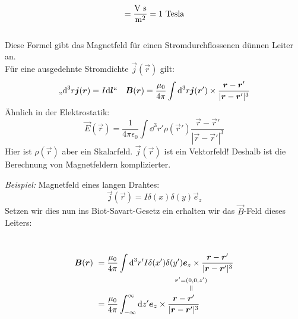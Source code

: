 \begin{equation*}
[\vec{B}] = \frac{\tx{V s}}{\tx{m}^2} = 1 \tx{ Tesla}
\end{equation*}\\[5pt]
\noindent
Diese Formel gibt das Magnetfeld für einen Stromdurchflossenen dünnen Leiter an.\\[5pt]
Für eine ausgedehnte Stromdichte $ \vec{j}(\vec{r}) $ gilt:
\begin{equation*}
\textrm{,,} \textrm{d}^3 r \bm{j}(\bm{r}) = I \textrm{d} \bm{l}`` \quad \bm{B}(\bm{r}) = \frac{\mu_0}{4 \pi} \int \textrm{d}^3 r \bm{j}(\bm{r}') \times \frac{\bm{r}- \bm{r}'}{|\bm{r} - \bm{r}'|^3}
\end{equation*}
Ähnlich in der Elektrostatik:
\begin{equation*}
\vec{E}(\vec{r}) = \frac{1}{4 \pi \epsilon_0} \int \dd^3 r' \rho(\vec{r}') \frac{\vec{r} - \vec{r}'}{|\vec{r} - \vec{r}'|^3}
\end{equation*}
Hier ist $ \rho(\vec{r}) $ aber ein Skalarfeld. $ \vec{j}(\vec{r}) $ ist ein Vektorfeld! Deshalb ist die Berechnung von Magnetfeldern komplizierter.\\[5pt]
\begin{minipage}{.7\linewidth}
	\emph{Beispiel:} Magnetfeld eines langen Drahtes:
	\begin{equation*}
	\vec{j}(\vec{r}) = I \delta(x) \delta(y) \vec{e}_z
	\end{equation*}
	Setzen wir dies nun ins Biot-Savart-Gesetz ein erhalten wir das $ \vec{B} $-Feld dieses Leiters:
\end{minipage}%
\begin{minipage}{.3\linewidth}
	\centering
\end{minipage}%
\\
\begin{align*}
\vec{B}(\vec{r}) \ &= \frac{\mu_0}{4 \pi} \int \dd^3 r' I \delta (x') \delta (y') \vec{e}_z \times \frac{\vec{r} - \vec{r}'}{|\vec{r} - \vec{r}'|^3}\\
&= \frac{\mu_0}{4 \pi} \int_{-\infty}^{\infty} \dd z' \vec{e}_z \times \frac{\vec{r} - \equaltoup{\vec{r}'}{\mathclap{\vec{r}' = (0,0,z')}}}{|\vec{r} - \vec{r}'|^3}\\
\end{align*}
